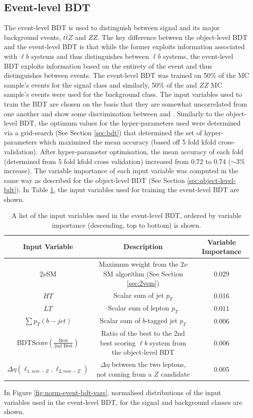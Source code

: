\subsection{Event-level BDT}
\label{sec:event-level-bdt}
The event-level BDT is used to distinguish between signal and its major background events, $t\bar{t}Z$ and $ZZ$. The key difference between the object-level BDT and the event-level BDT is that while the former exploits information associated with $\ell b$ systems and thus distinguishes between $\ell b$ systems, the event-level BDT exploits information based on the entirety of the event and thus distinguishes between events. The event-level BDT was trained on 50$\%$ of the \tWZ MC sample's events for the signal class and similarly, 50$\%$ of the \ttZ and $ZZ$ MC sample's events were used for the background class. The input variables used to train the BDT are chosen on the basis that they are somewhat uncorrelated from one another and show some discrimination between \tWZ and \ttZ. Similarly to the object-level BDT, the optimum values for the hyper-parameters used were determined via a grid-search (See Section \ref{sec:bdt}) that determined the set of hyper-parameters which maximized the mean accuracy (based off 5 fold kfold cross-validation). After hyper-parameter optimisation, the mean accuracy of each fold (determined from 5 fold kfold cross validation) increased from 0.72 to 0.74 ($\sim 3\%$ increase). The variable importance of each input variable was computed in the same way as described for the object-level BDT (See Section \ref{sec:object-level-bdt}). In Table \ref{tab:event-bdt-variables}, the input variables used for training the event-level BDT are shown.
\begin{table}[htbp!]
\fontsize{8.5}{9}\selectfont
\def\arraystretch{1.4}
	\begin{tabular}{c|c|c}
    \toprule
	Input Variable 	& Description & Variable Importance  \\
	\hline
	2$\nu$SM	& Maximum weight from the 2$\nu$SM algorithm  (See Section \ref{sec:2vsm}) & 0.029\\
	$HT$	&  Scalar sum of jet $p_{T}$ & 0.016 \\
    $LT$ & Scalar sum of lepton $p_{T}$ & 0.011\\ 
	 $\sum p_{T}(b-jet)$	& Scalar sum of $b$-tagged jet $p_{T}$ & 0.006\\
	BDTScore$(\frac{\text{Best}}{\text{2nd Best}})$ & Ratio of the best to the 2nd best scoring $\ell b$ system from the object-level BDT & 0.006\\
		
		$\Delta \eta (\ell_{1,non-Z}, \ell_{2,non-Z})$ & $\Delta \eta$ between the two leptons, not coming from a $Z$ candidate & 0.005 \\

    \bottomrule
\end{tabular}
\caption{A list of the input variables used in the event-level BDT, ordered by variable importance (descending, top to bottom) is shown.}
	\label{tab:event-bdt-variables}
\end{table}In Figure \ref{fig:norm-event-bdt-vars}, normalised distributions of the input variables used in the event-level BDT, for the signal and background classes are shown.
    
